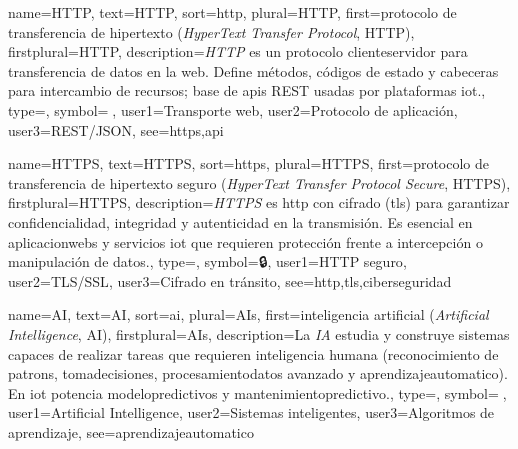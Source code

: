 	{
		name={HTTP},
		text={HTTP},
		sort={http},
		plural={HTTP},
		first={protocolo de transferencia de hipertexto (\textit{HyperText Transfer Protocol}, HTTP)},
		firstplural={HTTP},
		description={\emph{HTTP} es un protocolo \gls{cliente}\textendash\gls{servidor} para transferencia de \glspl{dato} en la web. Define m{\'e}todos, c{\'o}digos de estado y cabeceras para intercambio de recursos; base de \glspl{api} REST usadas por plataformas \gls{iot}.},
		type=\glsdefaulttype,
		symbol={🔗},
		user1={Transporte web},
		user2={Protocolo de aplicaci{\'o}n},
		user3={REST/JSON},
		see={https,api}
	}
	
	{
		name={HTTPS},
		text={HTTPS},
		sort={https},
		plural={HTTPS},
		first={protocolo de transferencia de hipertexto seguro (\textit{HyperText Transfer Protocol Secure}, HTTPS)},
		firstplural={HTTPS},
		description={\emph{HTTPS} es \gls{http} con cifrado (\gls{tls}) para garantizar confidencialidad, \gls{integridad} y autenticidad en la transmisi{\'o}n. Es esencial en \glspl{aplicacionweb} y servicios \gls{iot} que requieren protecci{\'o}n frente a intercepci{\'o}n o manipulaci{\'o}n de \glspl{dato}.},
		type=\glsdefaulttype,
		symbol={🔒},
		user1={HTTP seguro},
		user2={TLS/SSL},
		user3={Cifrado en tr{\'a}nsito},
		see={http,tls,ciberseguridad}
	}
	
	{
		name={AI},
		text={AI},
		sort={ai},
		plural={AIs},
		first={inteligencia artificial (\textit{Artificial Intelligence}, AI)},
		firstplural={AIs},
		description={La \emph{IA} estudia y construye sistemas capaces de realizar tareas que requieren inteligencia humana (reconocimiento de \glspl{patron}, \gls{tomadecisiones}, \gls{procesamientodatos} avanzado y \gls{aprendizajeautomatico}). En \gls{iot} potencia \glspl{modelopredictivo} y \gls{mantenimientopredictivo}.},
		type=\glsdefaulttype,
		symbol={🧠},
		user1={Artificial Intelligence},
		user2={Sistemas inteligentes},
		user3={Algoritmos de aprendizaje},
		see={aprendizajeautomatico}
	}
	
	
